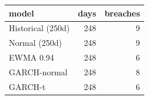
\begin{tabular}{lrr}
\toprule
model & days & breaches\\
\midrule
Historical (250d) & 248 & 9\\
Normal (250d) & 248 & 9\\
EWMA 0.94 & 248 & 6\\
GARCH-normal & 248 & 8\\
GARCH-t & 248 & 6\\
\bottomrule
\end{tabular}
